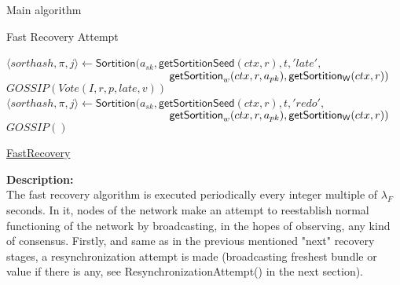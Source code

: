 \documentclass[10pt,a4paper]{article}
\begin{document}
\begin{section}{Main algorithm}
\begin{subsection}{Fast Recovery Attempt}
\begin{algorithm}[H]
\begin{algorithmic}[1]
                \State $\langle sorthash, \pi, j\rangle\gets 
                \mathsf{Sortition}(
                a_{sk}, 
                \mathsf{getSortitionSeed}(ctx, r), 
                t, 
                'late', $ \newline
                ${}$ ${\hskip 5.2cm}\mathsf{getSortition}_w(ctx, r, a_{pk}), 
                \mathsf{getSortition_W}(ctx, r)
                )$
                    \State $GOSSIP(Vote(I, r, p, late, v))$
                \EndIf
                    \State $\langle sorthash, \pi, j\rangle\gets 
                    \mathsf{Sortition}(
                    a_{sk}, 
                    \mathsf{getSortitionSeed}(ctx, r), 
                    t, 
                    'redo', $ \newline
                    ${}$ ${\hskip 5.2cm}\mathsf{getSortition}_w(ctx, r, a_{pk}), 
                    \mathsf{getSortition_W}(ctx, r)
                    )$
                        \State $GOSSIP()$
                    \EndIf
            \Else
                
            \EndIf    
        \EndFor


        \EndFunction
        \end{algorithmic}
        \caption{\underline{FastRecovery}}
    \end{algorithm}
    
    
\noindent \textbf{Description:}\\
The fast recovery algorithm is executed periodically every integer multiple of $\lambda_F$
seconds. In it, nodes of the network make an attempt to reestablish normal functioning
of the network by broadcasting, in the hopes of observing, any kind of consensus.
Firstly, and same as in the previous mentioned "next" recovery stages, a resynchronization attempt
is made (broadcasting freshest bundle or value if there is any, see ResynchronizationAttempt() in the next section).


\end{subsection}


\end{section}
\end{document}
